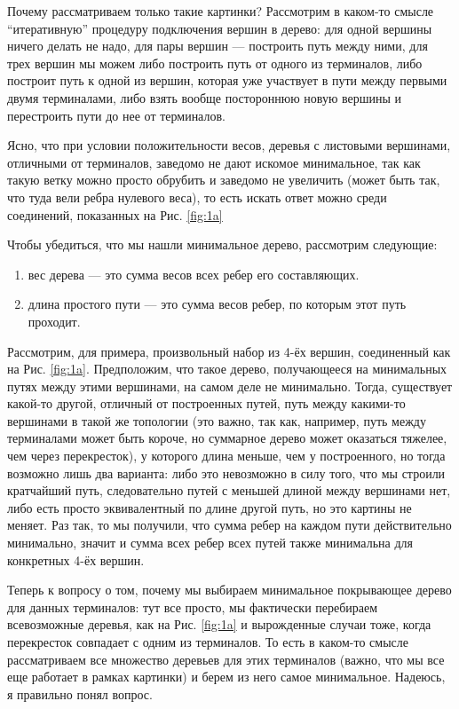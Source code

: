 \begin{solution}
\begin{enumerate}
\begin{upd}
            \begin{remark}
                Почему рассматриваем только такие картинки? Рассмотрим в каком-то смысле ``итеративную'' процедуру подключения вершин в дерево: для одной вершины ничего делать не надо, для пары вершин --- построить путь между ними, для трех вершин мы можем либо построить путь от одного из терминалов, либо построит путь к одной из вершин, которая уже участвует в пути между первыми двумя терминалами, либо взять вообще постороннюю новую вершины и перестроить пути до нее от терминалов. 
                
                Ясно, что при условии положительности весов, деревья с листовыми вершинами, отличными от терминалов, заведомо не дают искомое минимальное, так как такую ветку можно просто обрубить и заведомо не увеличить (может быть так, что туда вели ребра нулевого веса), то есть искать ответ можно среди соединений, показанных на Рис. \ref{fig:1a}
            \end{remark}

            Чтобы убедиться, что мы нашли минимальное дерево, рассмотрим следующие: 
            \begin{enumerate}[1.]
                \item вес дерева --- это сумма весов всех ребер его составляющих.
                \item длина простого пути --- это сумма весов ребер, по которым этот путь проходит.
            \end{enumerate}
            Рассмотрим, для примера, произвольный набор из 4-ёх вершин, соединенный как на Рис. \ref{fig:1a}. Предположим, что такое дерево, получающееся на минимальных путях между этими вершинами, на самом деле не минимально. Тогда, существует какой-то другой, отличный от построенных путей, путь между какими-то вершинами в такой же топологии (это важно, так как, например, путь между терминалами может быть короче, но суммарное дерево может оказаться тяжелее, чем через перекресток), у которого длина меньше, чем у построенного, но тогда возможно лишь два варианта: либо это невозможно в силу того, что мы строили кратчайший путь, следовательно путей с меньшей длиной между вершинами нет, либо есть просто эквивалентный по длине другой путь, но это картины не меняет. Раз так, то мы получили, что сумма ребер на каждом пути действительно минимально, значит и сумма всех ребер всех путей также минимальна для конкретных 4-ёх вершин.

            Теперь к вопросу о том, почему мы выбираем минимальное покрывающее дерево для данных терминалов: тут все просто, мы фактически перебираем всевозможные деревья, как на Рис. \ref{fig:1a} и вырожденные случаи тоже, когда перекресток совпадает с одним из терминалов. То есть в каком-то смысле рассматриваем все множество деревьев для этих терминалов (важно, что мы все еще работает в рамках картинки) и берем из него самое минимальное. Надеюсь, я правильно понял вопрос.
        \end{upd}


\end{enumerate}
\end{solution}
